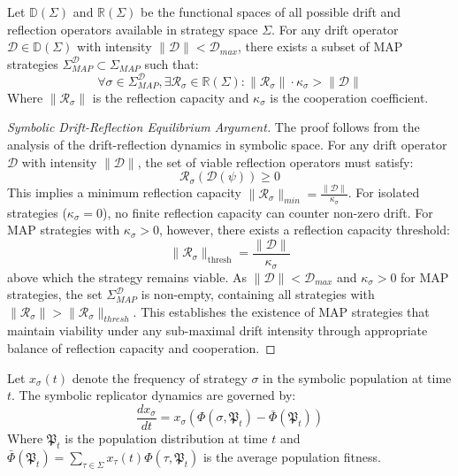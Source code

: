 \begin{theorem} \label{theorem:bk5_rift_reflection_balance_in_strategy_space}
Let $\mathbb{D}(\Sigma)$ and $\mathbb{R}(\Sigma)$ be the functional spaces of all possible drift and reflection operators available in strategy space $\Sigma$. For any drift operator $\mathcal{D} \in \mathbb{D}(\Sigma)$ with intensity $\|\mathcal{D}\| < \mathcal{D}_{max}$, there exists a subset of MAP strategies $\Sigma_{MAP}^{\mathcal{D}} \subset \Sigma_{MAP}$ such that:
\begin{equation}
\forall \sigma \in \Sigma_{MAP}^{\mathcal{D}}, \exists \mathcal{R}_\sigma \in \mathbb{R}(\Sigma) : \|\mathcal{R}_\sigma\| \cdot \kappa_\sigma > \|\mathcal{D}\|
\end{equation}
Where $\|\mathcal{R}_\sigma\|$ is the reflection capacity and $\kappa_\sigma$ is the cooperation coefficient.
\end{theorem}
\begin{proof}[Symbolic Drift-Reflection Equilibrium Argument]
\label{proof:bk5_drift_reflection_equilibrium}
The proof follows from the analysis of the drift-reflection dynamics in symbolic space.
For any drift operator $\mathcal{D}$ with intensity $\|\mathcal{D}\|$, the set of viable reflection operators must satisfy:
\begin{equation}
\mathcal{R}_\sigma(\mathcal{D}(\psi)) \geq 0
\end{equation}
This implies a minimum reflection capacity $\|\mathcal{R}_\sigma\|_{min} = \frac{\|\mathcal{D}\|}{\kappa_\sigma}$.
For isolated strategies ($\kappa_\sigma = 0$), no finite reflection capacity can counter non-zero drift.
For MAP strategies with \( \kappa_\sigma > 0 \), however, there exists a reflection capacity threshold:
\[
\|\mathcal{R}_\sigma\|_{\text{thresh}} = \frac{\|\mathcal{D}\|}{\kappa_\sigma}
\]
above which the strategy remains viable.
As $\|\mathcal{D}\| < \mathcal{D}_{max}$ and $\kappa_\sigma > 0$ for MAP strategies, the set $\Sigma_{MAP}^{\mathcal{D}}$ is non-empty, containing all strategies with $\|\mathcal{R}_\sigma\| > \|\mathcal{R}_\sigma\|_{thresh}$.
This establishes the existence of MAP strategies that maintain viability under any sub-maximal drift intensity through appropriate balance of reflection capacity and cooperation.
\end{proof}
\begin{definition} \label{definition:bk5_symbolic_replicator_dynamics}

Let $x_\sigma(t)$ denote the frequency of strategy $\sigma$ in the symbolic population at time $t$. The symbolic replicator dynamics are governed by:
\begin{equation}
\frac{dx_\sigma}{dt} = x_\sigma \left( \Phi(\sigma, \mathfrak{P}_t) - \bar{\Phi}(\mathfrak{P}_t) \right)
\end{equation}
Where $\mathfrak{P}_t$ is the population distribution at time $t$ and $\bar{\Phi}(\mathfrak{P}_t) = \sum_{\tau \in \Sigma} x_\tau(t) \Phi(\tau, \mathfrak{P}_t)$ is the average population fitness.
\end{definition}
